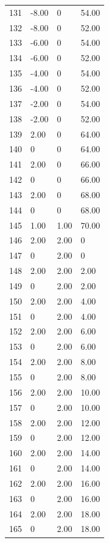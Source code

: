 \documentclass[a4paper,11pt]{article}
\begin{document}
\begin{center}
\begin{longtable}{|R{1.5cm}|R{2.4cm}|R{2.4cm}|R{2.4cm}|}
  131 &  -8.00  & 0  &  54.00 \\ 
  132 &  -8.00  & 0  &  52.00 \\ 
  133 &  -6.00  & 0  &  54.00 \\ 
  134 &  -6.00  & 0  &  52.00 \\ 
  135 &  -4.00  & 0  &  54.00 \\ 
  136 &  -4.00  & 0  &  52.00 \\ 
  137 &  -2.00  & 0  &  54.00 \\ 
  138 &  -2.00  & 0  &  52.00 \\ 
  139 &   2.00  & 0  &  64.00 \\ 
  140 & 0  & 0  &  64.00 \\ 
  141 &   2.00  & 0  &  66.00 \\ 
  142 & 0  & 0  &  66.00 \\ 
  143 &   2.00  & 0  &  68.00 \\ 
  144 & 0  & 0  &  68.00 \\ 
  145 &   1.00  &   1.00  &  70.00 \\ 
  146 &   2.00  &   2.00  & 0 \\ 
  147 & 0  &   2.00  & 0 \\ 
  148 &   2.00  &   2.00  &   2.00 \\ 
  149 & 0  &   2.00  &   2.00 \\ 
  150 &   2.00  &   2.00  &   4.00 \\ 
  151 & 0  &   2.00  &   4.00 \\ 
  152 &   2.00  &   2.00  &   6.00 \\ 
  153 & 0  &   2.00  &   6.00 \\ 
  154 &   2.00  &   2.00  &   8.00 \\ 
  155 & 0  &   2.00  &   8.00 \\ 
  156 &   2.00  &   2.00  &  10.00 \\ 
  157 & 0  &   2.00  &  10.00 \\ 
  158 &   2.00  &   2.00  &  12.00 \\ 
  159 & 0  &   2.00  &  12.00 \\ 
  160 &   2.00  &   2.00  &  14.00 \\ 
  161 & 0  &   2.00  &  14.00 \\ 
  162 &   2.00  &   2.00  &  16.00 \\ 
  163 & 0  &   2.00  &  16.00 \\ 
  164 &   2.00  &   2.00  &  18.00 \\ 
  165 & 0  &   2.00  &  18.00 \\ 

\end{longtable}
\end{center}
\end{document}
